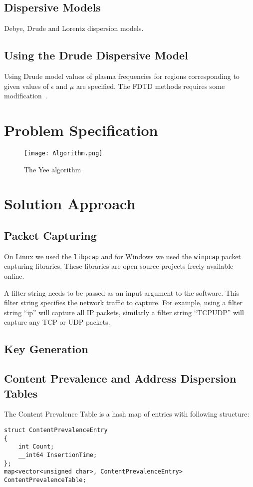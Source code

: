 \documentclass{report}
\begin{document}
\section{Dispersive Models}
Debye, Drude and Lorentz dispersion models.

\section{Using the Drude Dispersive Model}
Using Drude model values of plasma frequencies for regions corresponding to given values of $\epsilon$ and $\mu$ are specified. The FDTD methods requires some modification~\cite{Radial-Zhao}.

\chapter{Problem Specification}

\begin{figure}[here]
\centering
\texttt{[image: Algorithm.png]}
\caption{The Yee algorithm}
\label{Algorithm}
\end{figure}

\chapter{Solution Approach}

\section{Packet Capturing}
On Linux we used the \texttt{libpcap} and for Windows we used the \texttt{winpcap} packet capturing libraries. These libraries are open source projects freely available online.

A filter string needs to be passed as an input argument to the software. This filter string specifies the network traffic to capture. For example, using a filter string ``ip'' will capture all IP packets, similarly a filter string ``TCP\textbar\textbar UDP'' will capture any TCP or UDP packets.

\section{Key Generation}

\section{Content Prevalence and Address Dispersion Tables}
The Content Prevalence Table is a hash map of entries with following structure:
\begin{verbatim}
struct ContentPrevalenceEntry
{
    int Count;
    __int64 InsertionTime;
};
map<vector<unsigned char>, ContentPrevalenceEntry> ContentPrevalenceTable;
\end{verbatim}
\end{document}
